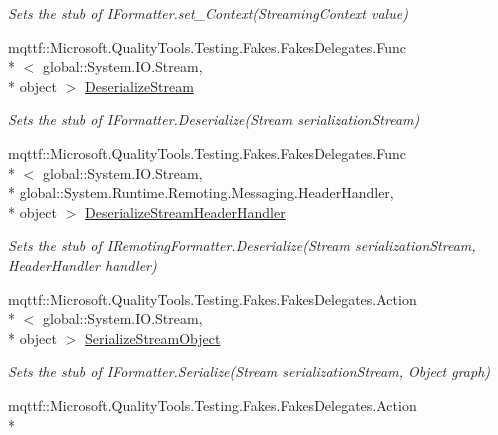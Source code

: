 \begin{DoxyCompactItemize}
\begin{DoxyCompactList}\small\item\em Sets the stub of I\-Formatter.\-set\-\_\-\-Context(\-Streaming\-Context value)\end{DoxyCompactList}\item 
mqttf\-::\-Microsoft.\-Quality\-Tools.\-Testing.\-Fakes.\-Fakes\-Delegates.\-Func\\*
$<$ global\-::\-System.\-I\-O.\-Stream, \\*
object $>$ \hyperlink{class_system_1_1_runtime_1_1_remoting_1_1_messaging_1_1_fakes_1_1_stub_i_remoting_formatter_a32d8b6d78e47847bdb8b35ce1da8695f}{Deserialize\-Stream}
\begin{DoxyCompactList}\small\item\em Sets the stub of I\-Formatter.\-Deserialize(\-Stream serialization\-Stream)\end{DoxyCompactList}\item 
mqttf\-::\-Microsoft.\-Quality\-Tools.\-Testing.\-Fakes.\-Fakes\-Delegates.\-Func\\*
$<$ global\-::\-System.\-I\-O.\-Stream, \\*
global\-::\-System.\-Runtime.\-Remoting.\-Messaging.\-Header\-Handler, \\*
object $>$ \hyperlink{class_system_1_1_runtime_1_1_remoting_1_1_messaging_1_1_fakes_1_1_stub_i_remoting_formatter_aaab66c493fbfaa35b6699ef7679e1f8c}{Deserialize\-Stream\-Header\-Handler}
\begin{DoxyCompactList}\small\item\em Sets the stub of I\-Remoting\-Formatter.\-Deserialize(\-Stream serialization\-Stream, Header\-Handler handler)\end{DoxyCompactList}\item 
mqttf\-::\-Microsoft.\-Quality\-Tools.\-Testing.\-Fakes.\-Fakes\-Delegates.\-Action\\*
$<$ global\-::\-System.\-I\-O.\-Stream, \\*
object $>$ \hyperlink{class_system_1_1_runtime_1_1_remoting_1_1_messaging_1_1_fakes_1_1_stub_i_remoting_formatter_a1c2621a1e4b7874a2c8f239988589202}{Serialize\-Stream\-Object}
\begin{DoxyCompactList}\small\item\em Sets the stub of I\-Formatter.\-Serialize(\-Stream serialization\-Stream, Object graph)\end{DoxyCompactList}\item 
mqttf\-::\-Microsoft.\-Quality\-Tools.\-Testing.\-Fakes.\-Fakes\-Delegates.\-Action\\*

\end{DoxyCompactItemize}
